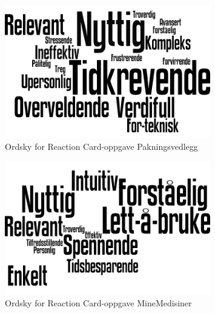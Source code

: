 \begin{figure}[H]
    \centering
    \includegraphics[width=0.8\textwidth]{fig/resultat/ordskyP.png}
    \caption{Ordsky for Reaction Card-oppgave Pakningsvedlegg}
    \label{fig:ordskyP}
\end{figure}

\begin{figure}[H]
    \centering
    \includegraphics[width=0.8\textwidth]{fig/resultat/ordskyMM.png}
    \caption{Ordsky for Reaction Card-oppgave MineMedisiner}
    \label{fig:ordskyMM}
\end{figure}


